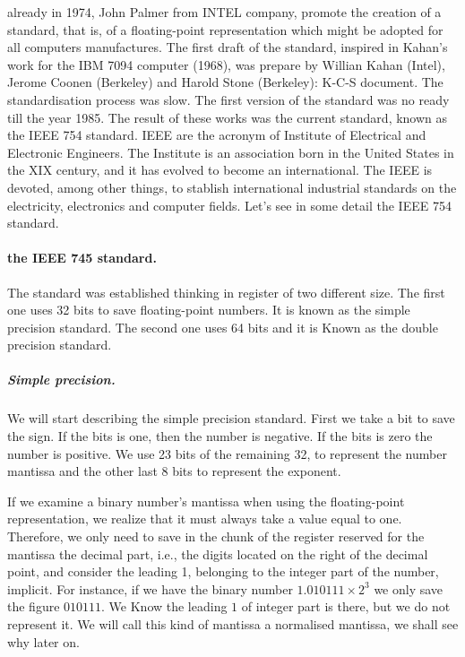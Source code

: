 \begin{paracol}{2}
already in 1974, John Palmer from INTEL company, promote the creation of a standard, that is, of a floating-point representation which might be adopted for all computers manufactures. The first draft of the standard, inspired in Kahan's work for the IBM 7094 computer (1968), was prepare by Willian Kahan (Intel), Jerome Coonen (Berkeley) and Harold Stone (Berkeley): K-C-S document. The standardisation process was slow. The first version of the standard was no ready till the year 1985. The result of these works was the current standard, known as the IEEE 754 standard. IEEE are the acronym of Institute of Electrical and Electronic Engineers. The Institute is an association born in the United States in the XIX century, and it has evolved to become an international. The IEEE is devoted, among other things, to stablish international industrial standards on the electricity, electronics and computer fields. Let's see in some detail the IEEE 754 standard.

\paragraph{the IEEE 745 standard.} The standard was established thinking in register of two different size. The first one uses 32 bits to save floating-point numbers. It is known as the simple precision standard. The second one uses 64 bits and it is Known as the double precision standard.

\subparagraph{Simple precision.} We will start describing the simple precision standard. First we take a bit to save the sign. If the bits is one, then the number is negative. If the bits is zero the number is positive. We use 23 bits of the remaining 32, to represent the number mantissa and the other last 8 bits to represent the exponent. 
 
 If we examine a binary number's mantissa when using the floating-point representation, we realize that it must always take a value equal to one. Therefore, we only need to save in the chunk of the register reserved for the mantissa the decimal part, i.e., the digits located on the right of the decimal point, and consider the leading 1, belonging to the integer part of the number, implicit. For instance, if we have the binary number $1.010111\times 2^{3}$ we only save the figure $010111$. We Know the leading $1$ of integer part is there, but we do not represent it. We will call this kind of mantissa a normalised mantissa, we shall see why later on.


\end{paracol}
